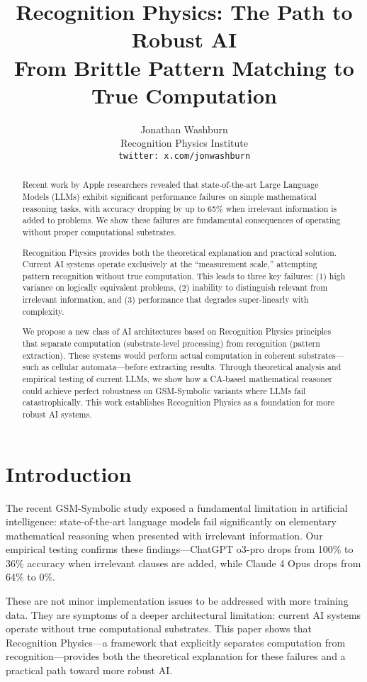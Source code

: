 \documentclass[11pt,letterpaper]{article}
\title{Recognition Physics: The Path to Robust AI\\
\Large From Brittle Pattern Matching to True Computation}
\author{
Jonathan Washburn\\
Recognition Physics Institute\\
\texttt{twitter: x.com/jonwashburn}
}
\theoremstyle{plain}
\theoremstyle{definition}
\theoremstyle{remark}
\begin{document}
\maketitle

\begin{abstract}
Recent work by Apple researchers revealed that state-of-the-art Large Language Models (LLMs) exhibit significant performance failures on simple mathematical reasoning tasks, with accuracy dropping by up to 65\% when irrelevant information is added to problems. We show these failures are fundamental consequences of operating without proper computational substrates. 

Recognition Physics provides both the theoretical explanation and practical solution. Current AI systems operate exclusively at the ``measurement scale,'' attempting pattern recognition without true computation. This leads to three key failures: (1) high variance on logically equivalent problems, (2) inability to distinguish relevant from irrelevant information, and (3) performance that degrades super-linearly with complexity.

We propose a new class of AI architectures based on Recognition Physics principles that separate computation (substrate-level processing) from recognition (pattern extraction). These systems would perform actual computation in coherent substrates—such as cellular automata—before extracting results. Through theoretical analysis and empirical testing of current LLMs, we show how a CA-based mathematical reasoner could achieve perfect robustness on GSM-Symbolic variants where LLMs fail catastrophically. This work establishes Recognition Physics as a foundation for more robust AI systems.
\end{abstract}

\section{Introduction}

The recent GSM-Symbolic study \cite{mirzadeh2024gsm} exposed a fundamental limitation in artificial intelligence: state-of-the-art language models fail significantly on elementary mathematical reasoning when presented with irrelevant information. Our empirical testing confirms these findings—ChatGPT o3-pro drops from 100\% to 36\% accuracy when irrelevant clauses are added, while Claude 4 Opus drops from 64\% to 0\%.

These are not minor implementation issues to be addressed with more training data. They are symptoms of a deeper architectural limitation: current AI systems operate without true computational substrates. This paper shows that Recognition Physics—a framework that explicitly separates computation from recognition—provides both the theoretical explanation for these failures and a practical path toward more robust AI.
\end{document}

